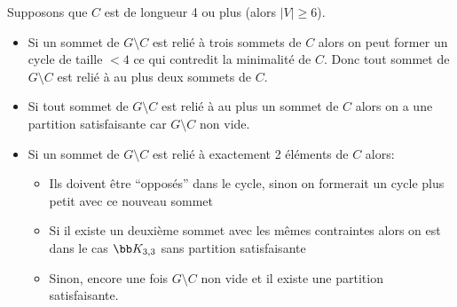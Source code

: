 Supposons que \(C\) est de longueur 4 ou plus (alors \(|V| \geq 6\)).

\begin{itemize}
    \item Si un sommet de \(G\setminus C\) est relié à trois sommets de \(C\) alors on peut former un cycle de taille \(<4\) ce qui contredit la minimalité de \(C\).
    Donc tout sommet de \(G\setminus C\) est relié à au plus deux sommets de \(C\).

    \item Si tout sommet de \(G\setminus C\) est relié à au plus un sommet de \(C\) alors on a une partition satisfaisante car \(G\setminus C\) non vide.

    \item Si un sommet de \(G\setminus C\) est relié à exactement 2 éléments de \(C\) alors:
    \begin{itemize}
        \item Ils doivent être ``opposés'' dans le cycle, sinon on formerait un cycle plus petit avec ce nouveau sommet
        \item Si il existe un deuxième sommet avec les mêmes contraintes alors on est dans le cas \(\bb K_{3,3}\) sans partition satisfaisante
        \item Sinon, encore une fois \(G\setminus C\) non vide et il existe une partition satisfaisante.
    \end{itemize}
\end{itemize}



